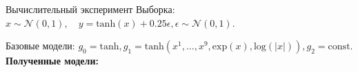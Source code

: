 \documentclass[usenames,dvipsnames,11pt,pdf,utf8,russian,aspectratio=43]{beamer}
\begin{document}
\iffalse
\begin{frame}{Вычислительный эксперимент}
\small
Выборка:
$
x \sim \mathcal{N}(0,1), \quad y = \text{tanh}(x)+0.25\epsilon, \epsilon \sim \mathcal{N}(0, 1).
$

{Базовые модели: }$
g_0 = \text{tanh}, g_1 = \text{tanh}(x^1,\dots, x^9, \text{exp}(x), \text{log}(|x|)), g_2 = \text{const}.
$
\textbf{Полученные модели:}
\vspace{-1cm}
\begin{figure}[h]                                                                                                                               
\centering                                                                                                                                      
\end{figure}   


\end{frame}
\end{document}
